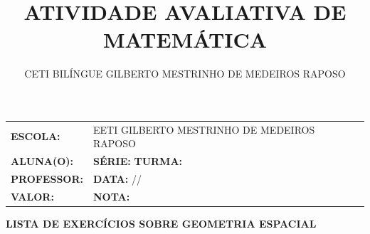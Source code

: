 \documentclass[12pt]{article}
\title{ATIVIDADE AVALIATIVA DE MATEMÁTICA}
\author{CETI BILÍNGUE GILBERTO MESTRINHO DE MEDEIROS RAPOSO}
\date{}
\begin{document}
    \thispagestyle{empty}
    \vspace{0.5cm}
    \begin{center}
        \large
        \begin{tabular}{|l l|}
            \hline
            \textbf{ESCOLA:} & EETI GILBERTO MESTRINHO DE MEDEIROS RAPOSO \\ 
            \textbf{ALUNA(O):} & \underline{\hspace{7cm}} \textbf{SÉRIE:} \underline{\hspace{1.5cm}} \textbf{TURMA:} \underline{\hspace{1.5cm}} \\
            \textbf{PROFESSOR:} & \underline{\hspace{7cm}} \textbf{DATA:} \underline{\hspace{1.5cm}}/\underline{\hspace{1.5cm}}/\underline{\hspace{1.5cm}} \\
            \textbf{VALOR:} & \underline{\hspace{3cm}} \textbf{NOTA:} \underline{\hspace{1.5cm}} \\
            \hline
        \end{tabular}
    \end{center}
    \vspace{0.5cm}
    
    \begin{center}
        \Large\textbf{LISTA DE EXERCÍCIOS SOBRE GEOMETRIA ESPACIAL}
    \end{center}
    
    \vspace{0.3cm}
    
\end{document}
